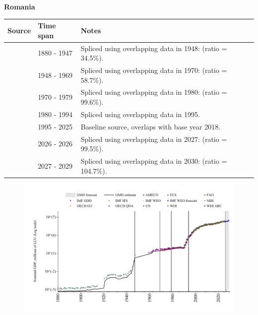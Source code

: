 \documentclass[12pt,a4paper,landscape]{article}
\begin{document}
\begin{adjustbox}{max totalsize={\paperwidth}{\paperheight},center}
\begin{minipage}[t][\textheight][t]{\textwidth}
\vspace*{0.5cm}
{}
\begin{center}
{\Large\bfseries Romania}
\end{center}
\vspace{0.5cm}
\begin{table}[H]
\centering
\small
\begin{tabular}{|l|l|l|}
\hline
\textbf{Source} & \textbf{Time span} & \textbf{Notes} \\
\hline
\rowcolor{white}\cite{NBS}& 1880 - 1947 &Spliced using overlapping data in 1948: (ratio = 34.5\%).\\
\rowcolor{lightgray}\cite{IMF_GDD}& 1948 - 1969 &Spliced using overlapping data in 1970: (ratio = 58.7\%).\\
\rowcolor{white}\cite{UN}& 1970 - 1979 &Spliced using overlapping data in 1980: (ratio = 99.6\%).\\
\rowcolor{lightgray}\cite{AMECO}& 1980 - 1994 &Spliced using overlapping data in 1995.\\
\rowcolor{white}\cite{OECD_EO}& 1995 - 2025 &Baseline source, overlaps with base year 2018.\\
\rowcolor{lightgray}\cite{AMECO}& 2026 - 2026 &Spliced using overlapping data in 2027: (ratio = 99.5\%).\\
\rowcolor{white}\cite{IMF_WEO_forecast}& 2027 - 2029 &Spliced using overlapping data in 2030: (ratio = 104.7\%).\\
\hline
\end{tabular}
\end{table}
\begin{figure}[H]
\centering
\includegraphics[width=\textwidth,height=0.6\textheight,keepaspectratio]{graphs/ROU_nGDP.pdf}
\end{figure}
\end{minipage}
\end{adjustbox}
\end{document}
